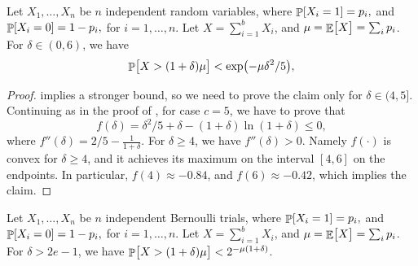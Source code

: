 \begin{fragment}{}
    \begin{lemma}
        Let $X_1, \ldots, X_n$ be $n$ independent random variables,
        where
        \begin{math}
            \Prob{  X_i = 1 } =p_i,
        \end{math}
        and
        \begin{math}
            \Prob{  X_i = 0 } =1- p_i,
        \end{math}
        for $i=1,\ldots, n$.  Let $X = \sum_{i=1}^{b} X_i$, and
        $\mu = \mathop{\mathbb{E}}\!\left[ {\bigl. X} \right] = \sum_i p_i$.  For $\delta \in (0,6)$,
        we have
        \begin{equation*}
            \Prob{ \bigl. X > (1+\delta)\mu } < \exp \pth{-\mu \delta^2 /
               5},
        \end{equation*}
    \end{lemma}
\end{fragment}
\begin{proof}
     implies a stronger bound, so we need
    to prove the claim only for $\delta \in (4,5]$.  Continuing as in
    the proof of , for case $c=5$, we
    have to prove that
    \begin{equation*}
        f(\delta) = \delta^2/5 + \delta -(1+\delta) \ln(1+\delta)
        \leq 0,
    \end{equation*}
    where
    \begin{math}
        f''(\delta) = 2/5 - \frac{1}{1+\delta}.
    \end{math}
    For $\delta \geq 4$, we have $f''(\delta) > 0$. Namely $f(\cdot)$
    is convex for $\delta \geq 4$, and it achieves its maximum on the
    interval $[4,6]$ on the endpoints. In particular,
    $f(4)\approx -0.84$, and $f(6) \approx -0.42$, which implies the
    claim.
\end{proof}





\begin{fragment}{}
    \begin{lemma}
        Let $X_1, \ldots, X_n$ be $n$ independent Bernoulli trials,
        where
        \begin{math}
            \Prob{ X_i = 1 } =p_i,
        \end{math}
        and
        \begin{math}
            \Prob{ X_i = 0 } =1- p_i,
        \end{math}
        for $i=1,\ldots, n$.  Let $X = \sum_{i=1}^{b} X_i$, and
        $\mu = \mathop{\mathbb{E}}\!\left[ {\bigl. X} \right] = \sum_i p_i$.  For $\delta > 2e-1$, we
        have
        $\Prob{ \bigl. X > (1+\delta)\mu } < 2^{-\mu (1 + \delta)}$.
    \end{lemma}
\end{fragment}

